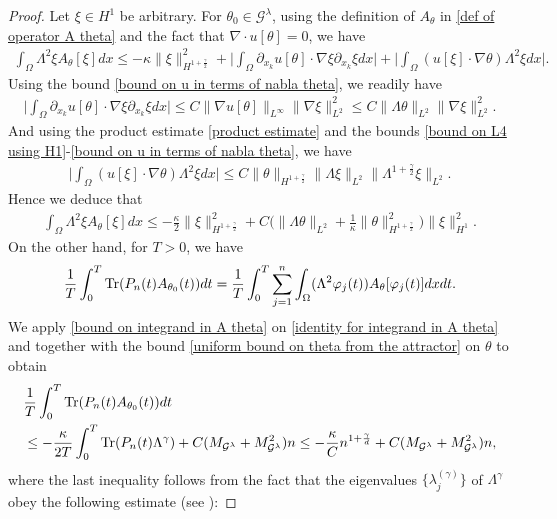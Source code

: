 \documentclass[reqno]{amsart}%
\theoremstyle{definition}
\theoremstyle{remark}
\numberwithin{equation}{section}
\newcommand{\1}{\mathbf{1}}
\newcommand{\Gg}{\mathcal{G}^{\lambda}}
\newcommand{\Tr}{\text{\rm Tr}}
\newcommand{\intox}{\int_{\Omega}}
\numberwithin{equation}{section}
\numberwithin{theorem}{section}
\numberwithin{figure}{section}
\begin{document}
\begin{proof}
Let $\xi\in H^1$ be arbitrary. For $\theta_0\in\Gg$, using the definition of $A_{\theta}$ in \eqref{def of operator A theta} and the fact that $\nabla\cdot u[\theta]=0$, we have
\begin{align*}
\intox\Lambda^2\xi A_{\theta}[\xi]dx\le-\kappa\|\xi\|^2_{H^{1+\frac{\gamma}{2}}}+\Big|\intox\partial_{x_k}u[\theta]\cdot\nabla\xi\partial_{x_k}\xi dx\Big|+\Big|\intox(u[\xi]\cdot\nabla\theta)\Lambda^2\xi dx\Big|. 
\end{align*}
Using the bound \eqref{bound on u in terms of nabla theta}, we readily have
\begin{align*}
\Big|\intox\partial_{x_k}u[\theta]\cdot\nabla\xi\partial_{x_k}\xi dx\Big|\le C\|\nabla u[\theta]\|_{L^\infty}\|\nabla \xi\|^2_{L^2}\le C\|\Lambda\theta\|_{L^2}\|\nabla \xi\|^2_{L^2}.
\end{align*}
And using the product estimate \eqref{product estimate} and the bounds \eqref{bound on L4 using H1}-\eqref{bound on u in terms of nabla theta}, we have
\begin{align*}
\Big|\intox(u[\xi]\cdot\nabla\theta)\Lambda^2\xi dx\Big|\le C\|\theta\|_{H^{1+\frac{\gamma}{2}}}\|\Lambda\xi\|_{L^2}\|\Lambda^{1+\frac{\gamma}{2}}\xi\|_{L^2}.
\end{align*}
Hence we deduce that
\begin{align}\label{bound on integrand in A theta}
\intox\Lambda^2\xi A_{\theta}[\xi]dx\le-\frac{\kappa}{2}\|\xi\|^2_{H^{1+\frac{\gamma}{2}}}+C\Big(\|\Lambda\theta\|_{L^2}+\frac{1}{\kappa}\|\theta\|^2_{H^{1+\frac{\gamma}{2}}}\Big)\|\xi\|^2_{H^1}.
\end{align}
On the other hand, for $T>0$, we have
\begin{align}\label{identity for integrand in A theta}
\frac{1}{T}\int_0^T\Tr(P_n(t)A_{\theta_0}(t))dt=\frac{1}{T}\int_0^T\sum_{j=1}^n\intox(\Lambda^2\varphi_j(t))A_{\theta}[\varphi_j(t)]dxdt.
\end{align}
We apply \eqref{bound on integrand in A theta} on \eqref{identity for integrand in A theta} and together with the bound \eqref{uniform bound on theta from the attractor} on $\theta$ to obtain
\begin{align*}
&\frac{1}{T}\int_0^T\Tr(P_n(t)A_{\theta_0}(t))dt\\
&\le -\frac{\kappa}{2T}\int_0^T\Tr(P_n(t)\Lambda^\gamma)+C(M_{\Gg}+M_{\Gg}^2)n\le -\frac{\kappa}{C}n^{1+\frac{\gamma}{d}}+C(M_{\Gg}+M_{\Gg}^2)n,
\end{align*}
where the last inequality follows from the fact that the eigenvalues $\{\lambda_{j}^{(\gamma)}\}$ of $\Lambda^\gamma$ obey the following estimate (see \cite[Theorem~1.1]{YY13}):

\end{proof}
\end{document}
